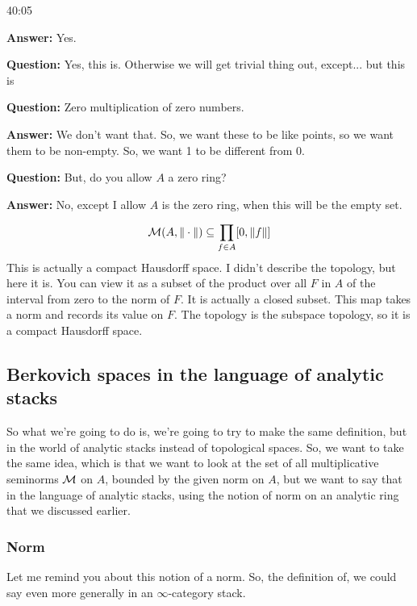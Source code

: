 \begin{example}
\begin{unfinished}{40:05}
\begin{example}
\textbf{Answer:} Yes.

\textbf{Question:} Yes, this is. Otherwise we will get trivial thing out, except... but this is 

\textbf{Question:} Zero multiplication of zero numbers.

\textbf{Answer:} We don't want that. So, we want these to be like points, so we want them to be non-empty. So, we want 1 to be different from 0.

\textbf{Question:}  But, do you allow $A$ a zero ring? 

\textbf{Answer:} No, except I allow $A$ is the zero ring, when this will be the empty set.

\end{example}

\begin{align}
\mathcal{M}(A, \| \cdot \|) \subseteq \prod_{f \in A} [0, \| f \| ]
\end{align}
This is actually a compact Hausdorff space. I didn't describe the topology, but here it is. You can view it as a subset of the product over all $F$ in $A$ of the interval from zero to the norm of $F$. It is actually a closed subset. This map takes a norm and records its value on $F$. The topology is the subspace topology, so it is a compact Hausdorff space.

\subsection{Berkovich spaces in the language of analytic stacks} \label{subsec:berk_spaces_language_analytic_stacks}
So what we're going to do is, we're going to try to make the same definition, but in the world of analytic stacks instead of topological spaces. So, we want to take the same idea, which is that we want to look at the set of all multiplicative seminorms $\mathcal{M}$ on $A$, bounded by the given norm on $A$, but we want to say that in the language of analytic stacks, using the notion of norm on an analytic ring that we discussed earlier.

\subsubsection{Norm} \label{subsubsec:norm_reminder}
Let me remind you about this notion of a norm. So, the definition of, we could say even more generally in an $\infty$-category stack. 


\end{unfinished}
\end{example}
